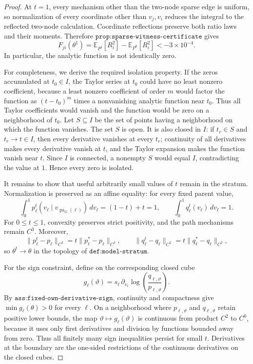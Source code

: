 \documentclass{article}
\begin{document}
\begin{proof}
At \(t=1\), every mechanism other than the two-node sparse edge is uniform, so normalization of every coordinate other than \(v_j,v_i\) reduces the integral to the reflected two-node calculation. Coordinate reflections preserve both ratio laws and their moments. Therefore \(\texttt{prop:sparse-witness-certificate}\) gives
\[
 F_{ji}(\theta^1)
 =\mathbb E_{P^j}[R_i^2]-\mathbb E_{P^0}[R_i^2]
 <-3\times10^{-4}.
\]
In particular, the analytic function is not identically zero.

For completeness, we derive the required isolation property. If the zeros accumulated at \(t_0\in I\), the Taylor series at \(t_0\) could have no least nonzero coefficient, because a least nonzero coefficient of order \(m\) would factor the function as \((t-t_0)^m\) times a nonvanishing analytic function near \(t_0\). Thus all Taylor coefficients would vanish and the function would be zero on a neighborhood of \(t_0\). Let \(S\subseteq I\) be the set of points having a neighborhood on which the function vanishes. The set \(S\) is open. It is also closed in \(I\): if \(t_r\in S\) and \(t_r\to t\in I\), then every derivative vanishes at every \(t_r\); continuity of all derivatives makes every derivative vanish at \(t\), and the Taylor expansion makes the function vanish near \(t\). Since \(I\) is connected, a nonempty \(S\) would equal \(I\), contradicting the value at \(1\). Hence every zero is isolated.

It remains to show that useful arbitrarily small values of \(t\) remain in the stratum. Normalization is preserved as an affine equality: for every fixed parent value,
\[
 \int_0^1p_\ell^t(v_\ell\mid v_{\operatorname{pa}_G(\ell)})\,dv_\ell
 =(1-t)+t=1,
 \qquad
 \int_0^1q_\ell^t(v_\ell)\,dv_\ell=1.
\]
For \(0\le t\le1\), convexity preserves strict positivity, and the path mechanisms remain \(C^3\). Moreover,
\[
 \|p_\ell^t-p_\ell\|_{C^2}=t\|p_\ell^*-p_\ell\|_{C^2},
 \qquad
 \|q_\ell^t-q_\ell\|_{C^2}=t\|q_\ell^*-q_\ell\|_{C^2},
\]
so \(\theta^t\to\theta\) in the topology of \(\texttt{def:model-stratum}\).

For the sign constraint, define on the corresponding closed cube
\[
 g_\ell(\vartheta)
 =s_\ell\,\partial_{v_\ell}
   \log\!\left(\frac{q_{\ell,\vartheta}}{p_{\ell,\vartheta}}\right).
\]
By \(\texttt{ass:fixed-own-derivative-sign}\), continuity and compactness give \(\min g_\ell(\theta)>0\) for every \(\ell\). On a neighborhood where \(p_{\ell,\vartheta}\) and \(q_{\ell,\vartheta}\) retain positive lower bounds, the map \(\vartheta\mapsto g_\ell(\vartheta)\) is continuous from product \(C^2\) to \(C^0\), because it uses only first derivatives and division by functions bounded away from zero. Thus all finitely many sign inequalities persist for small \(t\). Derivatives at the boundary are the one-sided restrictions of the continuous derivatives on the closed cubes.


\end{proof}
\end{document}
